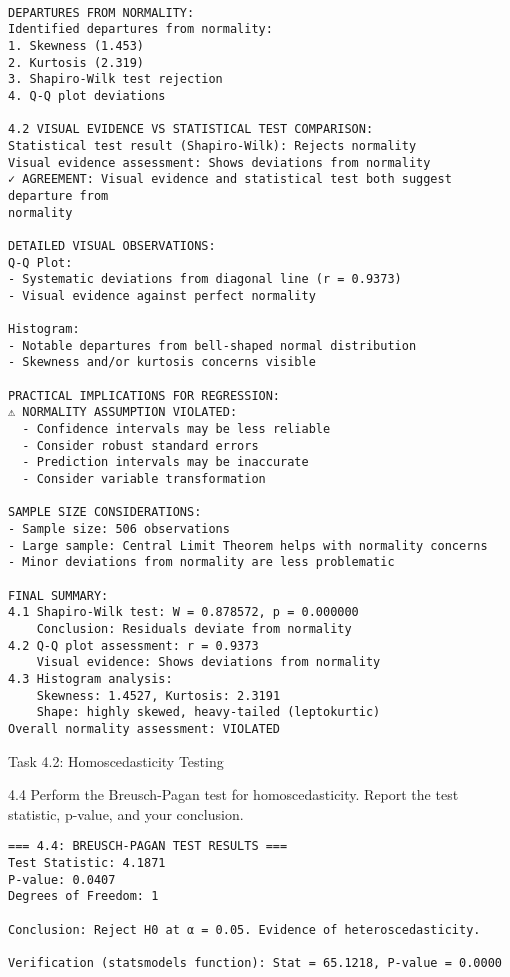 \documentclass[11pt, twocolumn]{article}
\begin{document}
    \begin{Verbatim}[commandchars=\\\{\}]

DEPARTURES FROM NORMALITY:
Identified departures from normality:
1. Skewness (1.453)
2. Kurtosis (2.319)
3. Shapiro-Wilk test rejection
4. Q-Q plot deviations

4.2 VISUAL EVIDENCE VS STATISTICAL TEST COMPARISON:
Statistical test result (Shapiro-Wilk): Rejects normality
Visual evidence assessment: Shows deviations from normality
✓ AGREEMENT: Visual evidence and statistical test both suggest departure from
normality

DETAILED VISUAL OBSERVATIONS:
Q-Q Plot:
- Systematic deviations from diagonal line (r = 0.9373)
- Visual evidence against perfect normality

Histogram:
- Notable departures from bell-shaped normal distribution
- Skewness and/or kurtosis concerns visible

PRACTICAL IMPLICATIONS FOR REGRESSION:
⚠ NORMALITY ASSUMPTION VIOLATED:
  - Confidence intervals may be less reliable
  - Consider robust standard errors
  - Prediction intervals may be inaccurate
  - Consider variable transformation

SAMPLE SIZE CONSIDERATIONS:
- Sample size: 506 observations
- Large sample: Central Limit Theorem helps with normality concerns
- Minor deviations from normality are less problematic

FINAL SUMMARY:
4.1 Shapiro-Wilk test: W = 0.878572, p = 0.000000
    Conclusion: Residuals deviate from normality
4.2 Q-Q plot assessment: r = 0.9373
    Visual evidence: Shows deviations from normality
4.3 Histogram analysis:
    Skewness: 1.4527, Kurtosis: 2.3191
    Shape: highly skewed, heavy-tailed (leptokurtic)
Overall normality assessment: VIOLATED
    \end{Verbatim}

    Task 4.2: Homoscedasticity Testing

    4.4 Perform the Breusch-Pagan test for homoscedasticity. Report the test
statistic, p-value, and your conclusion.

    \begin{Verbatim}[commandchars=\\\{\}]
=== 4.4: BREUSCH-PAGAN TEST RESULTS ===
Test Statistic: 4.1871
P-value: 0.0407
Degrees of Freedom: 1

Conclusion: Reject H0 at α = 0.05. Evidence of heteroscedasticity.

Verification (statsmodels function): Stat = 65.1218, P-value = 0.0000


    \end{Verbatim}
\end{document}
